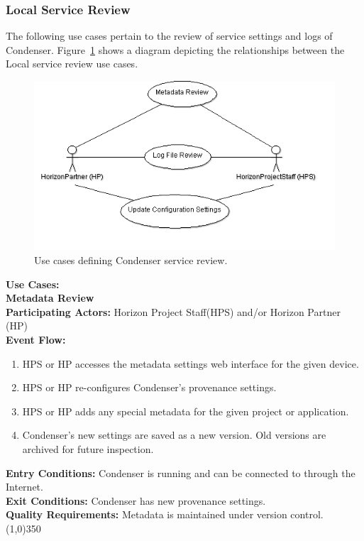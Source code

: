 \subsubsection{Local Service Review}	
The following use cases pertain to the review of service settings and logs of Condenser. Figure~\ref{LocalServiceReviewUse} shows a diagram depicting the relationships between the Local service review use cases.
\begin{center}
	\begin{figure}[htbp]
		\includegraphics[scale=.5]{images/LocalServiceReviewUse.png}
		\caption{Use cases defining Condenser service review.\label{LocalServiceReviewUse}}
	\end{figure}
\end{center}	
\textbf{Use Cases:}\\
	 
	\textbf{Metadata Review} \\	 
	\textbf{Participating Actors:} Horizon Project Staff(HPS) and/or Horizon Partner (HP)\\
	\textbf{Event Flow:}
	\begin{enumerate}
\item HPS or HP accesses the metadata settings web interface for the given device. 
\item HPS or HP re-configures Condenser's provenance settings.
\item HPS or HP adds any special metadata for the given project or application.
\item Condenser's new settings are saved as a new version. Old versions are archived for future inspection.
    \end{enumerate}
	\textbf{Entry Conditions:} Condenser is running and can be connected to through the Internet.\\
	\textbf{Exit Conditions:} Condenser has new provenance settings.\\
	\textbf{Quality Requirements:} Metadata is maintained under version control.\\
	\line(1,0){350}		
			 
